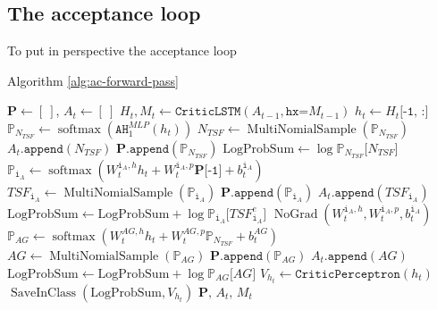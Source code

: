 \documentclass[
  12pt,
]{article}
\begin{document}
\subsection{The acceptance loop}\label{the-acceptance-loop}

To put in perspective the acceptance loop

Algorithm \ref{alg:ac-forward-pass}

\begin{algorithm} 
\caption{Actor-Critic Forward Pass}
\label{alg:ac-forward-pass}
\begin{algorithmic}[1] 
    
        \State $\mathbf{P} \gets [\ ]$, $A_t \gets [\ ]$ 
        \State $H_t, M_t \gets \texttt{CriticLSTM}\left(A_{t-1}, \texttt{hx=}M_{t-1}\right)$
        \State $h_t \gets H_t\texttt{[-1, :]}$
        \State $\mathbb{P}_{N_{TSF}} \gets \operatorname{softmax}\left(\texttt{AH}_1^{MLP}\left(h_t\right)\right)$ 
        \State $N_{TSF} \gets \operatorname{MultiNomialSample}\left(\mathbb{P}_{N_{TSF}}\right)$
        \State $A_t\texttt{.append}\left(N_{TSF}\right)$
        \State $\mathbf{P}\texttt{.append}\left(\mathbb{P}_{N_{TSF}}\right)$
        \State $\text{LogProbSum} \gets \log\mathbb{P}_{N_{TSF}}\texttt{[}N_{TSF} \texttt{]}$
            \State $\mathbb{P}_{\texttt{i}_A} \gets \operatorname{softmax}\left(W_t^{\texttt{i}_A, h}h_t + W_t^{\texttt{i}_A, p}\mathbf{P}\texttt{[-1]} + b_t^{\texttt{i}_A}\right)$ 
            \State $TSF_{\texttt{i}_A} \gets 
            \operatorname{MultiNomialSample}\left(\mathbb{P}_{\texttt{i}_A}\right)$
            \State $\mathbf{P}\texttt{.append}\left(\mathbb{P}_{\texttt{i}_A}\right)$
            \State $A_t\texttt{.append}\left(TSF_{\texttt{i}_A}\right)$
            \State $\text{LogProbSum} \gets \text{LogProbSum} +  \log\mathbb{P}_{\texttt{i}_A}\texttt{[}TSF^e_{\texttt{i}_A} \texttt{]}$
        \EndFor
            \State $\operatorname{NoGrad}\left(W_t^{\texttt{i}_A, h}, W_t^{\texttt{i}_A, p}, b_t^{\texttt{i}_A}\right)$
        \EndFor
        \State $\mathbb{P}_{AG} \gets \operatorname{softmax}\left(W_t^{AG, h}h_t + W_t^{AG, p}\mathbb{P}_{N_{TSF}} + b_t^{AG}\right)$ 
        \State $AG \gets \operatorname{MultiNomialSample}\left(\mathbb{P}_{AG}\right)$
        \State $\mathbf{P}\texttt{.append}\left(\mathbb{P}_{AG}\right)$
        \State $A_t\texttt{.append}\left(AG\right)$
        \State $\text{LogProbSum} \gets \text{LogProbSum} +  \log\mathbb{P}_{AG}\texttt{[}AG \texttt{]}$
        \State $V_{h_{t}} \gets \texttt{CriticPerceptron}\left(h_{t}\right)$ 
        \State $\operatorname{SaveInClass}\left(\text{LogProbSum}, V_{h_{t}}\right)$
        \State \Return $\mathbf{P},\, A_t,\, M_t$ 
    \EndProcedure
\end{algorithmic} 
\end{algorithm}
\end{document}
